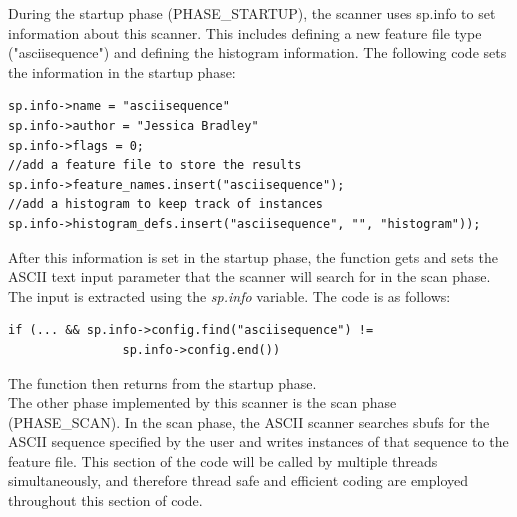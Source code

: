 \documentclass[11pt,fleqn]{article} %
\begin{document}
During the startup phase (PHASE\_STARTUP), the scanner uses sp.info to set information about this scanner. This includes defining a new feature file type ("asciisequence") and defining the histogram information. The following code sets the information in the startup phase:
\begin{lstlisting}
sp.info->name = "asciisequence"
sp.info->author = "Jessica Bradley"
sp.info->flags = 0; 
//add a feature file to store the results
sp.info->feature_names.insert("asciisequence");
//add a histogram to keep track of instances
sp.info->histogram_defs.insert("asciisequence", "", "histogram"));
\end{lstlisting}

After this information is set in the startup phase, the function gets and sets the ASCII text input parameter that the scanner will search for in the scan phase. The \bulk input is extracted using the \textit{sp.info} variable. The code is as follows:
\begin{lstlisting}
if (... && sp.info->config.find("asciisequence") != 
				sp.info->config.end())
\end{lstlisting}
The function then returns from the startup phase. \\

The other phase implemented by this scanner is the scan phase (PHASE\_SCAN).  In the scan phase, the ASCII scanner searches sbufs for the ASCII sequence specified by the user and writes instances of that sequence to the feature file. This section of the code will be called by multiple threads simultaneously, and therefore thread safe and efficient coding are employed throughout this section of code. \\
\end{document}
